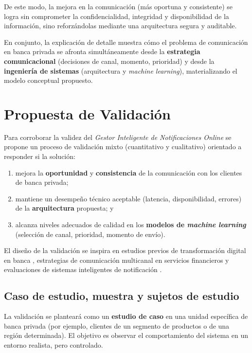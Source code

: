 \documentclass[conference]{IEEEtran}
\begin{document}
De este modo, la mejora en la comunicaci{\'o}n (m{\'a}s oportuna y consistente) se logra sin comprometer la confidencialidad, integridad y disponibilidad de la informaci{\'o}n, sino reforz{\'a}ndolas mediante una arquitectura segura y auditable.

En conjunto, la explicaci{\'o}n de detalle muestra c{\'o}mo el problema de comunicaci{\'o}n en banca privada se afronta simult{\'a}neamente desde la \textbf{estrategia comunicacional} (decisiones de canal, momento, prioridad) y desde la \textbf{ingenier{\'i}a de sistemas} (arquitectura y \textit{machine learning}), materializando el modelo conceptual propuesto.





\section{Propuesta de Validaci{\'o}n}

Para corroborar la validez del \textit{Gestor Inteligente de Notificaciones Online} se propone un proceso de validaci{\'o}n mixto (cuantitativo y cualitativo) orientado a responder si la soluci{\'o}n:
\begin{enumerate}
  \item mejora la \textbf{oportunidad} y \textbf{consistencia} de la comunicaci{\'o}n con los clientes de banca privada;
  \item mantiene un desempe{\~n}o t{\'e}cnico aceptable (latencia, disponibilidad, errores) de la \textbf{arquitectura} propuesta; y
  \item alcanza niveles adecuados de calidad en los \textbf{modelos de \textit{machine learning}} (selecci{\'o}n de canal, prioridad, momento de env{\'i}o).
\end{enumerate}

El dise{\~n}o de la validaci{\'o}n se inspira en estudios previos de transformaci{\'o}n digital en banca \cite{rahimi2021}, estrategias de comunicaci{\'o}n multicanal en servicios financieros \cite{torres2020,alzahrani2020} y evaluaciones de sistemas inteligentes de notificaci{\'o}n \cite{yancey2020,prabhakar2022}.

\subsection{Caso de estudio, muestra y sujetos de estudio}

La validaci{\'o}n se plantear{\'a} como un \textbf{estudio de caso} en una unidad espec{\'i}fica de banca privada (por ejemplo, clientes de un segmento de productos o de una regi{\'o}n determinada). El objetivo es observar el comportamiento del sistema en un entorno realista, pero controlado.
\end{document}
